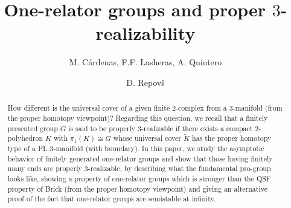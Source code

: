 \documentclass{amsart}[12pt]
\theoremstyle{definition}
\theoremstyle{remark}
\numberwithin{equation}{section}
\begin{document}
\title{One-relator groups and proper $3$-realizability}

\author{M. C\'ardenas, F.F. Lasheras, A. Quintero}
\address{Departamento de Geometr\'{\i}a y Topolog\'{\i}a, Universidad de Sevilla,
Apdo 1160, 41080-Sevilla, Spain}
\author{D. Repov{\v{s}}}
\address{Institute of Mathematics, Physics and Mechanics, University of Ljubljana,
P.O. Box 2964, Ljubljana 1001, Slovenia}


\date{}

\begin{abstract}
How different is the universal cover of a given finite $2$-complex
from a $3$-manifold (from the proper homotopy viewpoint)?
Regarding this question, we recall that a finitely presented group
$G$ is said to be properly $3$-realizable if there exists a
compact $2$-polyhedron $K$ with $\pi_1(K) \cong G$ whose universal
cover $\tilde{K}$ has the proper homotopy type of a PL
$3$-manifold (with boun\-dary). In this paper, we study the
asymptotic behavior of finitely generated one-relator groups and
show that those having finitely many ends are properly
$3$-realizable, by describing what the fundamental pro-group looks
like, showing a property of one-relator groups which is stronger
than the QSF property of Brick (from the proper homotopy
viewpoint) and giving an alternative proof of the fact that
one-relator groups are semistable at infinity.
\end{abstract}

\maketitle
\end{document}
